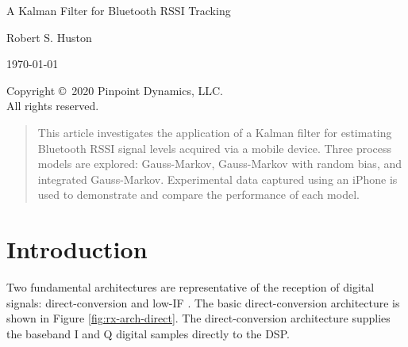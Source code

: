 \documentclass[12pt]{article}
\begin{document}
\setlength{\parskip}{12pt}      %



\begin{titlepage}
    \begin{center}
        \vspace*{\fill}
        
        \huge
        A Kalman Filter for Bluetooth RSSI Tracking
        
        \vspace{48pt}

        \large
        Robert S. Huston

        \vspace{12pt}
        
        \today

        \vspace{12pt}

        Copyright \copyright \ 2020 Pinpoint Dynamics, LLC. \\
        All rights reserved.
        
        \vfill
    \end{center}
\end{titlepage}



\begin{abstract}
This article investigates the application of a Kalman filter for estimating Bluetooth
RSSI signal levels acquired via a mobile device. Three process models are explored:
Gauss-Markov, Gauss-Markov with random bias, and integrated Gauss-Markov. Experimental
data captured using an iPhone is used to demonstrate and compare the performance of each
model.
\end{abstract}



\clearpage
\tableofcontents



%
%

\clearpage
\section{Introduction}

Two fundamental architectures are representative of the reception of digital signals:
direct-conversion and low-IF \cite{CMOSLowIFRX2002} \cite{BluetoothWiFiRX2004}. The basic
direct-conversion architecture is shown in Figure \ref{fig:rx-arch-direct}. The
direct-conversion architecture supplies the baseband I and Q digital samples directly to
the DSP.
\end{document}
